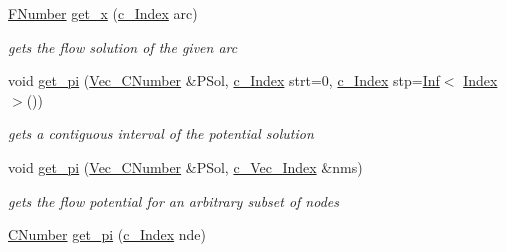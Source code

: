 \begin{Indent}
\begin{DoxyCompactItemize}
\mbox{\label{class_s_m_spp__di__unipi__it_1_1_m_c_f_block_a7dbf294d5c1eda3545e11ac313436e8e}} 
\mbox{\hyperlink{class_s_m_spp__di__unipi__it_1_1_m_c_f_block_aeea3e5951d222b2a8e57de1b4246a909}{F\+Number}} \mbox{\hyperlink{class_s_m_spp__di__unipi__it_1_1_m_c_f_block_a7dbf294d5c1eda3545e11ac313436e8e}{get\+\_\+x}} (\mbox{\hyperlink{class_s_m_spp__di__unipi__it_1_1_m_c_f_block_aee6156e2ce80720d57a082d80f39d8cc}{c\+\_\+\+Index}} arc)
\begin{DoxyCompactList}\small\item\em gets the flow solution of the given arc \end{DoxyCompactList}\item 
void \mbox{\hyperlink{class_s_m_spp__di__unipi__it_1_1_m_c_f_block_a8c68bce513e68a3db6efb7c81260096a}{get\+\_\+pi}} (\mbox{\hyperlink{class_s_m_spp__di__unipi__it_1_1_m_c_f_block_a9a7c9495f1f1feab22f3c556b70f60f0}{Vec\+\_\+\+C\+Number}} \&P\+Sol, \mbox{\hyperlink{class_s_m_spp__di__unipi__it_1_1_m_c_f_block_aee6156e2ce80720d57a082d80f39d8cc}{c\+\_\+\+Index}} strt=0, \mbox{\hyperlink{class_s_m_spp__di__unipi__it_1_1_m_c_f_block_aee6156e2ce80720d57a082d80f39d8cc}{c\+\_\+\+Index}} stp=\mbox{\hyperlink{class_s_m_spp__di__unipi__it_1_1_inf}{Inf}}$<$ \mbox{\hyperlink{class_s_m_spp__di__unipi__it_1_1_m_c_f_block_ad53d6229d7ec28555a9c9c2fd9abf773}{Index}} $>$())
\begin{DoxyCompactList}\small\item\em gets a contiguous interval of the potential solution \end{DoxyCompactList}\item 
void \mbox{\hyperlink{class_s_m_spp__di__unipi__it_1_1_m_c_f_block_ab1ec41f3f3cce072e80fdd7887884049}{get\+\_\+pi}} (\mbox{\hyperlink{class_s_m_spp__di__unipi__it_1_1_m_c_f_block_a9a7c9495f1f1feab22f3c556b70f60f0}{Vec\+\_\+\+C\+Number}} \&P\+Sol, \mbox{\hyperlink{class_s_m_spp__di__unipi__it_1_1_m_c_f_block_a03461123d4f6090aefeb97ef653d3f2b}{c\+\_\+\+Vec\+\_\+\+Index}} \&nms)
\begin{DoxyCompactList}\small\item\em gets the flow potential for an arbitrary subset of nodes \end{DoxyCompactList}\item 
\mbox{\hyperlink{class_s_m_spp__di__unipi__it_1_1_m_c_f_block_a24d0627ba8213afe1ec4ebeb4508e8f1}{C\+Number}} \mbox{\hyperlink{class_s_m_spp__di__unipi__it_1_1_m_c_f_block_aa4b481f2c50097b2f9c5aa5ab3c0c358}{get\+\_\+pi}} (\mbox{\hyperlink{class_s_m_spp__di__unipi__it_1_1_m_c_f_block_aee6156e2ce80720d57a082d80f39d8cc}{c\+\_\+\+Index}} nde)

\end{DoxyCompactItemize}
\end{Indent}
